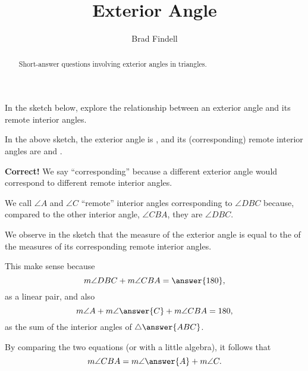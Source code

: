 \documentclass[nooutcomes]{ximera}
\title{Exterior Angle}
\author{Brad Findell}
\begin{document}
\begin{abstract}
Short-answer questions involving exterior angles in triangles. 
\end{abstract}
\maketitle


In the sketch below, explore the relationship between an exterior angle and its remote interior angles. 
\begin{center}  
\end{center}

\begin{problem}
In the above sketch, the exterior angle is 
, and its (corresponding) remote interior angles are  and . 

\begin{feedback}[correct]
\textbf{Correct!} We say ``corresponding'' because a different exterior angle would correspond to different remote interior angles.
\end{feedback}
\begin{problem}
We call $\angle A$ and $\angle C$ ``remote'' interior angles corresponding to $\angle DBC$ because, compared to the other interior angle, $\angle CBA$, they are 
 $\angle DBC$.
\end{problem}
\end{problem}

\begin{problem}
We observe in the sketch that the measure of the exterior angle is equal to the 
 of the measures of its corresponding remote interior angles.  

This make sense because 
\[
m\angle DBC + m\angle CBA = \answer{180},
\]
as a linear pair, and also 
\[
m\angle A + m\angle \answer{C} + m\angle CBA = 180, 
\]
as the sum of the interior angles of $\triangle \answer{ABC}$.  

By comparing the two equations (or with a little algebra), it follows that 
\[
m\angle CBA = m\angle \answer{A} + m\angle C.
\]
\end{problem}
\end{document}
